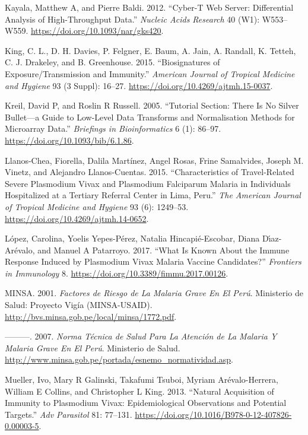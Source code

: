 \documentclass[
  a4paper]{article}
\begin{document}
\leavevmode\hypertarget{ref-kayala2012cyber}{}%
Kayala, Matthew A, and Pierre Baldi. 2012. ``Cyber-T Web Server:
Differential Analysis of High-Throughput Data.'' \emph{Nucleic Acids
Research} 40 (W1): W553--W559. \url{https://doi.org/10.1093/nar/gks420}.

\leavevmode\hypertarget{ref-King2015FOC}{}%
King, C. L., D. H. Davies, P. Felgner, E. Baum, A. Jain, A. Randall, K.
Tetteh, C. J. Drakeley, and B. Greenhouse. 2015. ``Biosignatures of
Exposure/Transmission and Immunity.'' \emph{American Journal of Tropical
Medicine and Hygiene} 93 (3 Suppl): 16--27.
\url{https://doi.org/10.4269/ajtmh.15-0037}.

\leavevmode\hypertarget{ref-kreil2005bullet}{}%
Kreil, David P, and Roslin R Russell. 2005. ``Tutorial Section: There Is
No Silver Bullet---a Guide to Low-Level Data Transforms and
Normalisation Methods for Microarray Data.'' \emph{Briefings in
Bioinformatics} 6 (1): 86--97. \url{https://doi.org/10.1093/bib/6.1.86}.

\leavevmode\hypertarget{ref-llanoschea2015}{}%
Llanos-Chea, Fiorella, Dalila Martínez, Angel Rosas, Frine Samalvides,
Joseph M. Vinetz, and Alejandro Llanos-Cuentas. 2015. ``Characteristics
of Travel-Related Severe Plasmodium Vivax and Plasmodium Falciparum
Malaria in Individuals Hospitalized at a Tertiary Referral Center in
Lima, Peru.'' \emph{The American Journal of Tropical Medicine and
Hygiene} 93 (6): 1249--53. \url{https://doi.org/10.4269/ajtmh.14-0652}.

\leavevmode\hypertarget{ref-lopez2017}{}%
López, Carolina, Yoelis Yepes-Pérez, Natalia Hincapié-Escobar, Diana
Dı́az-Arévalo, and Manuel A Patarroyo. 2017. ``What Is Known About the
Immune Response Induced by Plasmodium Vivax Malaria Vaccine
Candidates?'' \emph{Frontiers in Immunology} 8.
\url{https://doi.org/10.3389/fimmu.2017.00126}.

\leavevmode\hypertarget{ref-factores2001}{}%
MINSA. 2001. \emph{Factores de Riesgo de La Malaria Grave En El Perú}.
Ministerio de Salud: Proyecto Vigía (MINSA-USAID).
\url{http://bvs.minsa.gob.pe/local/minsa/1772.pdf}.

\leavevmode\hypertarget{ref-norma2001}{}%
---------. 2007. \emph{Norma Técnica de Salud Para La Atención de La
Malaria Y Malaria Grave En El Perú}. Ministerio de Salud.
\url{http://www.minsa.gob.pe/portada/esnemo_normatividad.asp}.

\leavevmode\hypertarget{ref-mueller2013}{}%
Mueller, Ivo, Mary R Galinski, Takafumi Tsuboi, Myriam Arévalo-Herrera,
William E Collins, and Christopher L King. 2013. ``Natural Acquisition
of Immunity to Plasmodium Vivax: Epidemiological Observations and
Potential Targets.'' \emph{Adv Parasitol} 81: 77--131.
\url{https://doi.org/10.1016/B978-0-12-407826-0.00003-5}.
\end{document}
